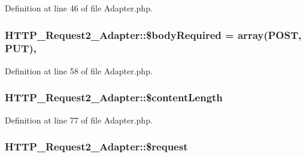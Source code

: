 Definition at line 46 of file Adapter.\+php.

\subsubsection[{\texorpdfstring{\$body\+Required}{$bodyRequired}}]{\setlength{\rightskip}{0pt plus 5cm}H\+T\+T\+P\+\_\+\+Request2\+\_\+\+Adapter\+::\$body\+Required = array(\textquotesingle{}P\+O\+ST\textquotesingle{}, \textquotesingle{}P\+UT\textquotesingle{})\hspace{0.3cm}{\ttfamily [static]}, {\ttfamily [protected]}}\hypertarget{classHTTP__Request2__Adapter_a1c84e4f08fed2fdd4511ea12bf479595}{}\label{classHTTP__Request2__Adapter_a1c84e4f08fed2fdd4511ea12bf479595}


Definition at line 58 of file Adapter.\+php.

\subsubsection[{\texorpdfstring{\$content\+Length}{$contentLength}}]{\setlength{\rightskip}{0pt plus 5cm}H\+T\+T\+P\+\_\+\+Request2\+\_\+\+Adapter\+::\$content\+Length\hspace{0.3cm}{\ttfamily [protected]}}\hypertarget{classHTTP__Request2__Adapter_ac8dc7108f1d54ec9b94224f57577cc3e}{}\label{classHTTP__Request2__Adapter_ac8dc7108f1d54ec9b94224f57577cc3e}


Definition at line 77 of file Adapter.\+php.

\subsubsection[{\texorpdfstring{\$request}{$request}}]{\setlength{\rightskip}{0pt plus 5cm}H\+T\+T\+P\+\_\+\+Request2\+\_\+\+Adapter\+::\$request\hspace{0.3cm}{\ttfamily [protected]}}\hypertarget{classHTTP__Request2__Adapter_ad7df680c105146f9fdd4b386220be914}{}\label{classHTTP__Request2__Adapter_ad7df680c105146f9fdd4b386220be914}


